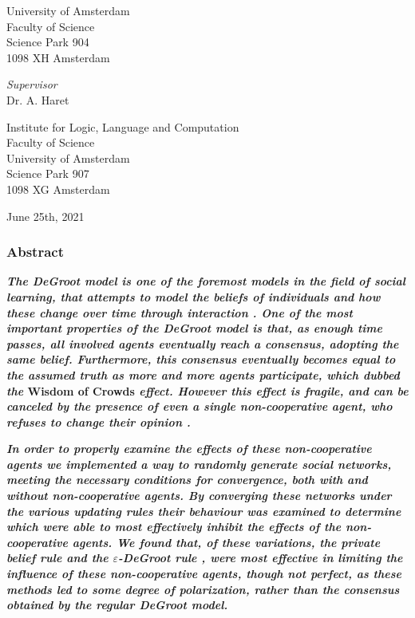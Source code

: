 \documentclass[a4paper, 12pt]{report}
\newcommand{\theSupervisor}{Dr. A. Haret} %
\newcommand{\theInstitute}{
Institute for Logic, Language and Computation\\ %
Faculty of Science\\
University of Amsterdam\\
Science Park 907 \\ %
1098 XG Amsterdam %
}
\newcommand{\theDate}{June 25th, 2021}
\begin{document}
\begin{center}
University of Amsterdam\\
Faculty of Science\\
Science Park 904\\
1098 XH Amsterdam

\vspace{2cm}

\emph{Supervisor}\\

\theSupervisor

\vspace{0.25cm}

\theInstitute

\vspace{1.0cm}

\theDate

\end{center}
\newpage

\thispagestyle{empty}

\tableofcontents

\thispagestyle{empty}


\newpage
\thispagestyle{empty}
\subsubsection{Abstract}

\noindent \textbf{\textit{The DeGroot model \parencite{degroot1974concensus} is one of the foremost models in the field of social learning, that attempts to model the beliefs of individuals and how these change over time through interaction \parencite{reed2010sociallearning}. One of the most important properties of the DeGroot model is that, as enough time passes, all involved agents eventually reach a consensus, adopting the same belief. Furthermore, this consensus eventually becomes equal to the assumed truth as more and more agents participate, which \cite{golub2010naive} dubbed the} Wisdom of Crowds \textit{effect. However this effect is fragile, and can be canceled by the presence of even a single non-cooperative agent, who refuses to change their opinion \parencite{amir2021robust}.}}

\textbf{\textit{In order to properly examine the effects of these non-cooperative agents we implemented a way to randomly generate social networks, meeting the necessary conditions for convergence, both with and without non-cooperative agents. By converging these networks under the various updating rules their behaviour was examined to determine which were able to most effectively inhibit the effects of the non-cooperative agents. We found that, of these variations, the private belief rule \parencite{friedkin1990private} and the $\varepsilon$-DeGroot rule \parencite{amir2021robust}, were most effective in limiting the influence of these non-cooperative agents, though not perfect, as these methods led to some degree of polarization, rather than the consensus obtained by the regular DeGroot model.}} 
\end{document}
